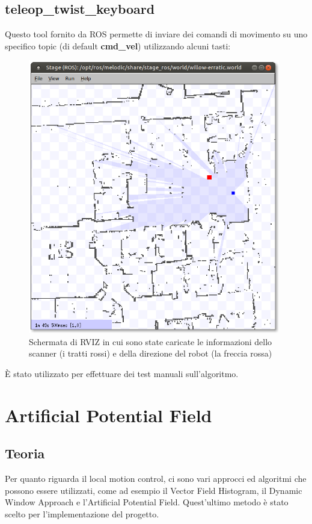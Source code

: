 \documentclass[Lau, binding=0.6cm, oneside]{sapthesis}
\begin{document}
\subsection{teleop\_twist\_keyboard}
Questo tool fornito da ROS permette di inviare dei comandi di movimento su uno specifico topic (di default \textbf{cmd\_vel}) utilizzando alcuni tasti:
\begin{figure}[H]
    \centering
    \includegraphics[width=11cm]{stage_ros.png}
    \caption{Schermata di RVIZ in cui sono state caricate le informazioni dello scanner (i tratti rossi) e della direzione del robot (la freccia rossa)}
    \label{fig:teleop}
\end{figure}
È stato utilizzato per effettuare dei test manuali sull'algoritmo.

\section{Artificial Potential Field}
\subsection{Teoria}
Per quanto riguarda il local motion control, ci sono vari approcci ed algoritmi che possono essere utilizzati, come ad esempio il Vector Field Histogram, il Dynamic Window Approach e l'Artificial Potential Field\cite{fonte1}.
Quest'ultimo metodo è stato scelto per l'implementazione del progetto.
\end{document}
